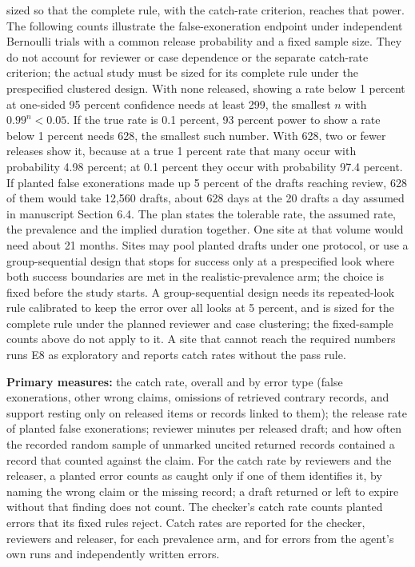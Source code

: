 \documentclass[
  11pt,
]{article}
\begin{document}
sized so that the complete rule, with the catch-rate criterion, reaches
that power. The following counts illustrate the false-exoneration
endpoint under independent Bernoulli trials with a common release
probability and a fixed sample size. They do not account for reviewer or
case dependence or the separate catch-rate criterion; the actual study
must be sized for its complete rule under the prespecified clustered
design. With none released, showing a rate below 1 percent at one-sided
95 percent confidence needs at least 299, the smallest \(n\) with
\(0.99^n<0.05\). If the true rate is 0.1 percent, 93 percent power to
show a rate below 1 percent needs 628, the smallest such number. With
628, two or fewer releases show it, because at a true 1 percent rate
that many occur with probability 4.98 percent; at 0.1 percent they occur
with probability 97.4 percent. If planted false exonerations made up 5
percent of the drafts reaching review, 628 of them would take 12,560
drafts, about 628 days at the 20 drafts a day assumed in manuscript
Section 6.4. The plan states the tolerable rate, the assumed rate, the
prevalence and the implied duration together. One site at that volume
would need about 21 months. Sites may pool planted drafts under one
protocol, or use a group-sequential design that stops for success only
at a prespecified look where both success boundaries are met in the
realistic-prevalence arm; the choice is fixed before the study starts. A
group-sequential design needs its repeated-look rule calibrated to keep
the error over all looks at 5 percent, and is sized for the complete
rule under the planned reviewer and case clustering; the fixed-sample
counts above do not apply to it. A site that cannot reach the required
numbers runs E8 as exploratory and reports catch rates without the pass
rule.

\textbf{Primary measures:} the catch rate, overall and by error type
(false exonerations, other wrong claims, omissions of retrieved contrary
records, and support resting only on released items or records linked to
them); the release rate of planted false exonerations; reviewer minutes
per released draft; and how often the recorded random sample of unmarked
uncited returned records contained a record that counted against the
claim. For the catch rate by reviewers and the releaser, a planted error
counts as caught only if one of them identifies it, by naming the wrong
claim or the missing record; a draft returned or left to expire without
that finding does not count. The checker's catch rate counts planted
errors that its fixed rules reject. Catch rates are reported for the
checker, reviewers and releaser, for each prevalence arm, and for errors
from the agent's own runs and independently written errors.
\end{document}
